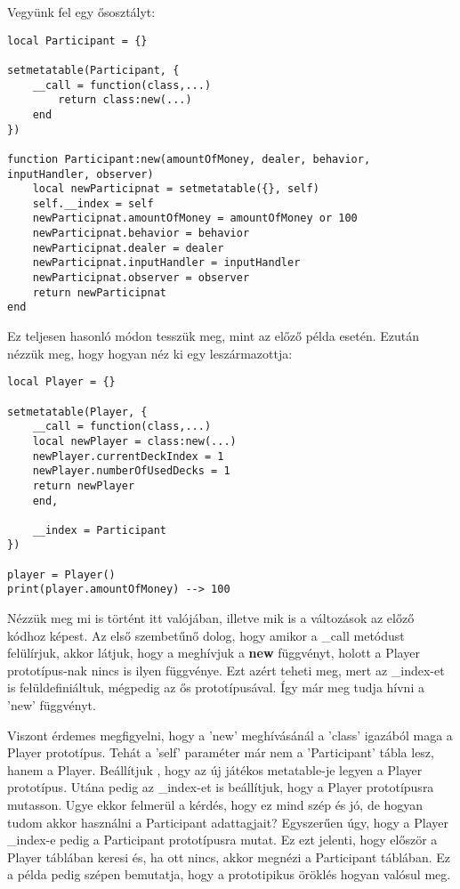 Vegyünk fel egy ősosztályt:
\scriptsize
\begin{lstlisting}
local Participant = {}

setmetatable(Participant, {
	__call = function(class,...)
		return class:new(...)
	end
})

function Participant:new(amountOfMoney, dealer, behavior, inputHandler, observer)
	local newParticipnat = setmetatable({}, self)
	self.__index = self
	newParticipnat.amountOfMoney = amountOfMoney or 100
	newParticipnat.behavior = behavior
	newParticipnat.dealer = dealer
	newParticipnat.inputHandler = inputHandler
	newParticipnat.observer = observer
	return newParticipnat
end
\end{lstlisting}
\normalsize
Ez teljesen hasonló módon tesszük meg, mint az előző példa esetén. Ezután nézzük meg, hogy hogyan néz ki egy leszármazottja:
\scriptsize
\begin{lstlisting}
local Player = {}

setmetatable(Player, {
	__call = function(class,...)
	local newPlayer = class:new(...)
	newPlayer.currentDeckIndex = 1
	newPlayer.numberOfUsedDecks = 1
	return newPlayer
	end,
	
	__index = Participant
})

player = Player()
print(player.amountOfMoney) --> 100
\end{lstlisting}
\normalsize
Nézzük meg mi is történt itt valójában, illetve mik is a változások az előző kódhoz képest. Az első szembetűnő dolog, hogy amikor a \_call metódust felülírjuk, akkor látjuk, hogy a meghívjuk a \textbf{new} függvényt, holott a Player prototípus-nak nincs is ilyen függvénye. Ezt azért teheti meg, mert az \_index-et is felüldefiniáltuk, mégpedig az ős prototípusával. Így már meg tudja hívni a 'new' függvényt. 

Viszont érdemes megfigyelni, hogy a 'new' meghívásánál a 'class' igazából maga a Player prototípus. Tehát a 'self' paraméter már nem a 'Participant' tábla lesz, hanem a Player. Beállítjuk , hogy az új játékos metatable-je legyen a Player prototípus. Utána pedig az \_index-et is beállítjuk, hogy a Player prototípusra mutasson. Ugye ekkor felmerül a kérdés, hogy ez mind szép és jó, de hogyan tudom akkor használni a Participant adattagjait? Egyszerűen úgy, hogy a Player \_index-e pedig a Participant prototípusra mutat. Ez ezt jelenti, hogy először a Player táblában keresi és, ha ott nincs, akkor megnézi a Participant táblában. Ez a példa pedig szépen bemutatja, hogy a prototipikus öröklés hogyan valósul meg.

